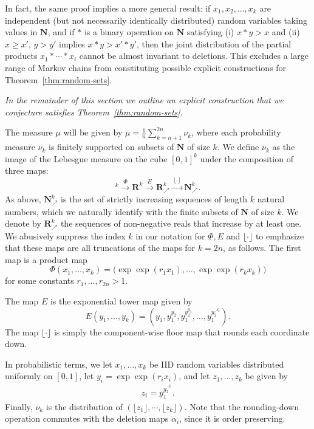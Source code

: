 \documentclass[12pt, pdflatex]{amsart}
\theoremstyle{definition}
\numberwithin{equation}{section}
\numberwithin{theorem}{section}
\newcommand{\RR}{\mathbf{R}}
\newcommand{\NN}{\mathbf{N}}
\newcommand{\incr}{\NN_\nearrow}
\newcommand{\incrR}{\RR_\nearrow}
\begin{document}
In fact, the same proof implies a more general result: if $x_1,x_2,\ldots,x_k$ are independent (but not necessarily identically distributed) random variables taking values in $\NN$, and if $*$ is a binary operation on $\NN$ satisfying (i) $x*y > x$ and (ii) $x\geq x'$, $y > y'$ implies $x * y > x' * y'$, then the joint distribution of the partial products $x_1 * \cdots * x_i$ cannot be almost invariant to deletions. This excludes a large range of Markov chains from constituting possible explicit constructions for Theorem~\ref{thm:random-sets}.

\medskip
\itshape
In the remainder of this section we outline an explicit construction that we conjecture  satisfies Theorem~\ref{thm:random-sets}.
\upshape

The measure $\mu$ will be given by $\mu = \frac{1}{n}\sum_{k=n+1}^{2n}\nu_k$, where each probability measure $\nu_k$ is finitely supported on subsets of $\NN$ of size $k$. We define $\nu_k$ as the image of the Lebesgue measure on the cube $[0,1]^k$ under the composition of three maps:
\begin{equation*}
[0,1]^k \xrightarrow{\ \Phi\ } \RR^k  \xrightarrow{\ E\ } \incrR^k \xrightarrow{\ \lfloor \cdot \rfloor\ } \incr^k.
\end{equation*}
As above,  $\incr^k$ is the set of strictly increasing sequences of length $k$ natural numbers, which we naturally identify with the finite subsets of $\NN$ of size $k$. We denote by  $\incrR^k$ the sequences of non-negative reals that increase by at least one.  We abusively suppress the index $k$ in our notation for $\Phi, E$ and $\lfloor \cdot \rfloor$ to emphasize that these maps are all truncations of the maps for $k=2n$, as follows. The first map is a product map
\begin{equation*}
 \Phi(x_1, \ldots, x_k) = \bigl(\exp\exp(r_1 x_1), \ldots, \exp\exp(r_k x_k)\bigr)
\end{equation*}
for some constants $r_1, \ldots, r_{2n} >1$.

The map $E$ is the exponential tower map given by
\begin{equation*}
    E(y_1,\ldots,y_k) = \left(y_1,y_1^{y_2}, y_1^{y_2^{y_3}}, \ldots, y_1^{y_2^{\iddots^{y_{k}}}}\right).
\end{equation*}
The map $\lfloor \cdot \rfloor$ is simply the component-wise floor map that rounds each coordinate down.

In probabilistic terms, we let $x_1,\ldots,x_{k}$ be IID random variables distributed uniformly on $[0,1]$, let $y_i = \exp\exp(r_ix_i)$, and let $z_1,\ldots,z_k$ be given by
\begin{align*}
    z_i = y_1^{y_2^{\iddots^{y_i}}}.
\end{align*}
Finally, $\nu_k$ is the distribution of $(\lfloor z_1 \rfloor,\cdots,\lfloor z_k \rfloor)$. Note that the rounding-down operation commutes with the deletion maps $\alpha_i$, since it is order preserving.
\end{document}
